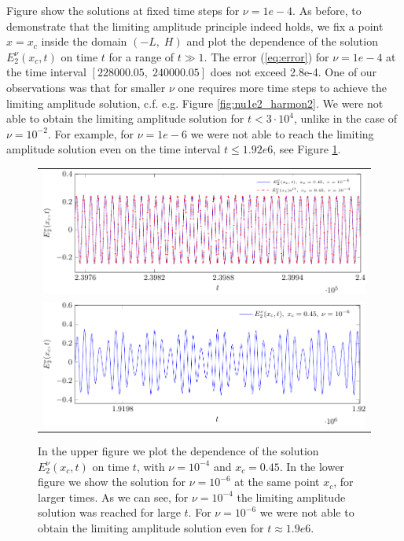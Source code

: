 Figure show the solutions at fixed time steps for $\nu=1e-4$. As before, 
to demonstrate that the limiting amplitude principle indeed holds, we fix a point $x=x_c$ 
inside the domain $(-L,\; H)$ and plot 
the dependence of the solution $E_{2}^{\nu}(x_c,t)$ on time $t$ for a range of $t\gg 1$. 
The error (\ref{eq:error}) for $\nu=1e-4$ at the time interval $[228000.05,\; 240000.05]$ does not exceed 2.8e-4. 
One of our observations was that for smaller $\nu$ one requires more time steps to achieve the limiting amplitude solution, 
c.f. e.g. Figure \ref{fig:nu1e2_harmon2}. 
We were not able to obtain the limiting amplitude solution for $t<3\cdot 10^{4}$, unlike in the case of $\nu=10^{-2}$. 
For example, for $\nu=1e-6$ we were not able to reach the limiting amplitude solution even on the time interval $t\leq 1.92e6$, 
see Figure \ref{fig:nu1e4_harmon}. 
\begin{figure}
\begin{tabular}{c}
 \includegraphics[width=\textwidth]{figure_nu1e4-crop.pdf}\\
 \includegraphics[width=\textwidth]{figure_nu1e6-crop.pdf}\\
\end{tabular}
\caption{In the upper figure we plot the dependence of the solution $E_{2}^{\nu}(x_c,t)$ on time $t$, with $\nu=10^{-4}$ and $x_c=0.45$. 
In the lower figure we show the solution for $\nu=10^{-6}$ at the same point $x_c$, for larger times. As we can see, for 
$\nu=10^{-4}$ the limiting amplitude solution was reached for large $t$. For $\nu=10^{-6}$ we were not able 
to obtain the limiting amplitude solution even for $t\approx 1.9e6$. }
  \label{fig:nu1e4_harmon}
\end{figure}

